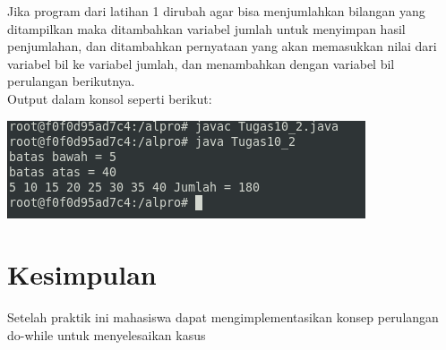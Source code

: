 \documentclass[a4paper,12pt]{article}
\begin{document}
\begin{enumerate}
\begin{minipage}[t]{\linewidth}
		\raggedright
	\end{minipage}
	Jika program dari latihan 1 dirubah agar bisa menjumlahkan bilangan yang ditampilkan maka ditambahkan variabel jumlah untuk menyimpan hasil penjumlahan, dan ditambahkan pernyataan yang akan memasukkan nilai dari variabel bil ke variabel jumlah, dan menambahkan dengan variabel bil perulangan berikutnya.\\
	Output dalam konsol seperti berikut:
	\begin{center}
		\includegraphics[scale=.8]{tugas2_2}
	\end{center}
\end{enumerate}

\newpage
\section{Kesimpulan}
Setelah praktik ini mahasiswa dapat mengimplementasikan konsep perulangan do-while untuk menyelesaikan kasus
\end{document}
